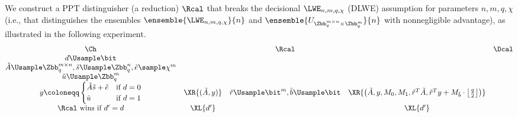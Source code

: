 \begin{answer}[i]
    We construct a PPT distinguisher (a reduction) $\Rcal$ that breaks the decisional $\LWE_{n,m,q,\chi}$ (DLWE) assumption for parameters $n,m,q,\chi$ (i.e., that distinguishes the ensembles $\ensemble{\LWE_{n,m,q,\chi}}{n}$ and $\ensemble{U_{\Zbb_q^{m\times n}\times \Zbb_q^m}}{n}$ with nonnegligible advantage), as illustrated in the following experiment.
    {
        \[
            \begin{array}{@{} c c c c c @{}}
            \Ch & & \Rcal & & \Dcal \\
            d\Usample\bit &&&&\\
            \tilde{A}\Usample\Zbb_q^{m\times n}, \tilde{s}\Usample\Zbb_q^n, \tilde{e}\sample\chi^m &&&&\\
            \tilde{u}\Usample\Zbb_q^m &&&&\\
            y\coloneqq \begin{cases}
                \tilde{A}\tilde{s}+\tilde{e} &\textrm{if } d=0 \\
                \tilde{u} &\textrm{if } d=1 \\
            \end{cases} & \XR{(\tilde{A}, y)} & \tilde{r}\Usample\bit^m, \tilde{b}\Usample\bit  & \XR{\left(\tilde{A}, y, M_0, M_1, \tilde{r}^T\tilde{A}, \tilde{r}^T y+M_{\tilde{b}} \cdot \left\lfloor\frac{q}{2}\right\rfloor\right)} & \\
            \textrm{$\Rcal$ wins if $d' = d$} & \XL{d'}  &  & \XL{d'}& \\
            \end{array}
        \]
        \label{fig:p6-game1}
    }


\end{answer}
